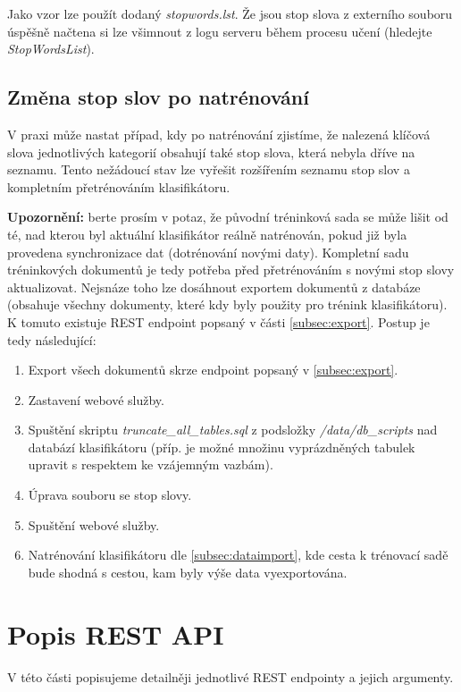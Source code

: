 \documentclass{article}
\begin{document}
Jako vzor lze použít dodaný \textit{stopwords.lst}. Že jsou stop slova z externího souboru úspěšně načtena si lze všimnout z logu serveru během procesu učení (hledejte \textit{StopWordsList}).

\subsection{Změna stop slov po natrénování}

V praxi může nastat případ, kdy po natrénování zjistíme, že nalezená klíčová slova jednotlivých kategorií obsahují také stop slova, která nebyla dříve na seznamu. Tento nežádoucí stav lze vyřešit rozšířením seznamu stop slov a kompletním přetrénováním klasifikátoru.

\textbf{Upozornění:} berte prosím v potaz, že původní tréninková sada se může lišit od té, nad kterou byl aktuální klasifikátor reálně natrénován, pokud již byla provedena synchronizace dat (dotrénování novými daty). Kompletní sadu tréninkových dokumentů je tedy potřeba před přetrénováním s novými stop slovy aktualizovat. Nejsnáze toho lze dosáhnout exportem dokumentů z databáze (obsahuje všechny dokumenty, které kdy byly použity pro trénink klasifikátoru). K tomuto existuje REST endpoint popsaný v části \ref{subsec:export}. Postup je tedy následující:

\begin{enumerate}
	\item Export všech dokumentů skrze endpoint popsaný v \ref{subsec:export}.
	\item Zastavení webové služby.
	\item Spuštění skriptu \textit{truncate\_all\_tables.sql} z podsložky \textit{/data/db\_scripts} nad databází klasifikátoru (příp. je možné množinu vyprázdněných tabulek upravit s respektem ke vzájemným vazbám).
	\item Úprava souboru se stop slovy.
	\item Spuštění webové služby.
	\item Natrénování klasifikátoru dle \ref{subsec:dataimport}, kde cesta k trénovací sadě bude shodná s cestou, kam byly výše data vyexportována.
\end{enumerate}

\section{Popis REST API}

V této části popisujeme detailněji jednotlivé REST endpointy a jejich argumenty.
\end{document}
